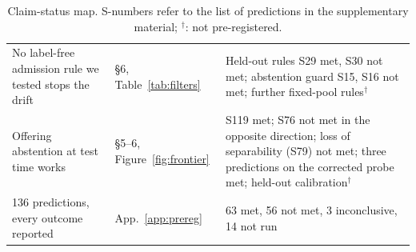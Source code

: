\begin{table}[tp]
\begin{tabular}{p{}p{}p{}}
No label-free admission rule we tested stops the drift & \S6, Table~\ref{tab:filters} & Held-out rules S29 met, S30 not met; abstention guard S15, S16 not met; further fixed-pool rules$^{\dagger}$ \\
Offering abstention at test time works & \S5--6, Figure~\ref{fig:frontier} & S119 met; S76 not met in the opposite direction; loss of separability (S79) not met; three predictions on the corrected probe met; held-out calibration$^{\dagger}$ \\
136 predictions, every outcome reported & App.~\ref{app:prereg} & 63 met, 56 not met, 3 inconclusive, 14 not run \\
\bottomrule
\end{tabular}
\caption{Claim-status map. S-numbers refer to the list of predictions in the supplementary material; $^{\dagger}$: not pre-registered.}
\label{tab:claims}
\end{table}

